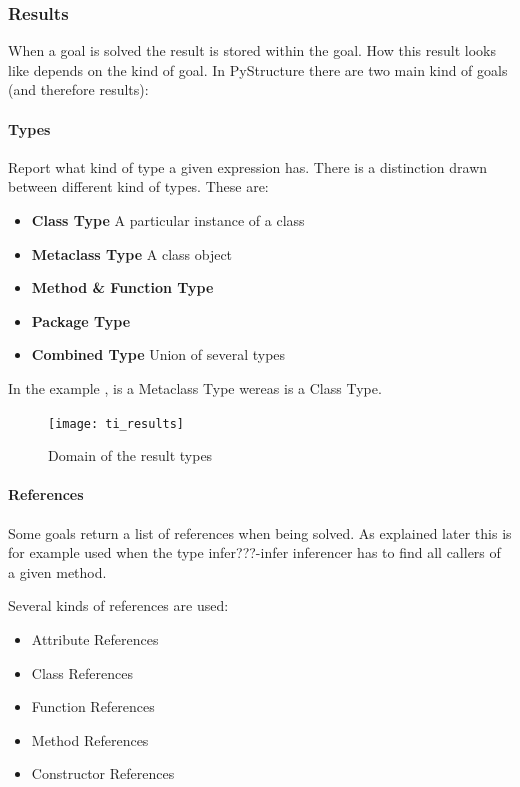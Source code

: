 \documentclass[12pt,halfparskip,DIV11,BCOR10mm]{scrreprt}
\begin{document}
\subsubsection{Results}

When a goal is solved the result is stored within the goal. How this result looks like depends on the kind of goal. In PyStructure there are two main kind of goals (and therefore results):

\paragraph{Types}

Report what kind of type a given expression has. There is a distinction drawn between different kind of types. These are:

\begin{itemize}
    \item \textbf{Class Type} A particular instance of a class
    \item \textbf{Metaclass Type} A class object
    \item \textbf{Method \& Function Type}
    \item \textbf{Package Type}
    \item \textbf{Combined Type} Union of several types
\end{itemize}

In the example ,  is a Metaclass Type wereas  is a Class Type.


\begin{figure}[H]
    \centering
    \texttt{[image: ti\_results]}
    \caption{Domain of the result types}
    \label{fig:ti_results}
\end{figure}

\paragraph{References}

Some goals return a list of references when being solved. As explained later this is for example used when the type infer???-infer inferencer has to find all callers of a given method.

Several kinds of references are used:

\begin{itemize}
	\item Attribute References
	\item Class References
	\item Function References
	\item Method References
	\item Constructor References
\end{itemize}
\end{document}

